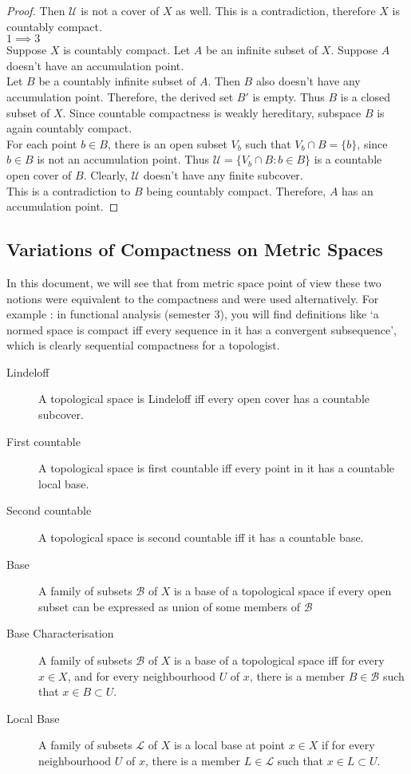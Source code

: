 \begin{proof}
	Then $\mathcal{U}$ is not a cover of $X$ as well.
	This is a contradiction, therefore $X$ is countably compact.\\

	$1 \implies 3$\\
	Suppose $X$ is countably compact.
	Let $A$ be an infinite subset of $X$.
	Suppose $A$ doesn't have an accumulation point.\\

	Let $B$ be a countably infinite subset of $A$.
	Then $B$ also doesn't have any accumulation point.
	Therefore, the derived set $B'$ is empty.
	Thus $B$ is a closed subset of $X$.
	Since countable compactness is weakly hereditary, subspace $B$ is again countably compact.\\

	For each point $b \in B$, there is an open subset $V_b$ such that $V_b \cap B = \{ b\}$, since $b \in B$ is not an accumulation point.
	Thus $\mathcal{U} = \{ V_b \cap B : b \in B \}$ is a countable open cover of $B$.
	Clearly, $\mathcal{U}$ doesn't have any finite subcover.\\

	This is a contradiction to $B$ being countably compact.
	Therefore, $A$ has an accumulation point.
\end{proof}

\subsection{Variations of Compactness on Metric Spaces}
	In this document, we will see that from metric space point of view these two notions were equivalent to the compactness and were used alternatively.
	For example : in functional analysis (semester 3), you will find definitions like `a normed space is compact iff every sequence in it has a convergent subsequence', which is clearly sequential compactness for a topologist.

\begin{description}
	\item[Lindeloff] A topological space is Lindeloff iff every open cover has a countable subcover.
	\item[First countable] A topological space is first countable iff every point in it has a countable local base.
	\item[Second countable] A topological space is second countable iff it has a countable base.
	\item[Base] A family of subsets $\mathcal{B}$ of $X$ is a base of a topological space if every open subset can be expressed as union of some members of $\mathcal{B}$
	\item[Base Characterisation] A family of subsets $\mathcal{B}$ of $X$ is a base of a topological space iff for every $x \in X$, and for every neighbourhood $U$ of $x$, there is a member $B \in \mathcal{B}$ such that $ x \in B \subset U$.
	\item[Local Base] A family of subsets $\mathcal{L}$ of $X$ is a local base at point $x \in X$ if for every neighbourhood $U$ of $x$, there is a member $L \in \mathcal{L}$ such that $x \in L \subset U$.
\end{description}


